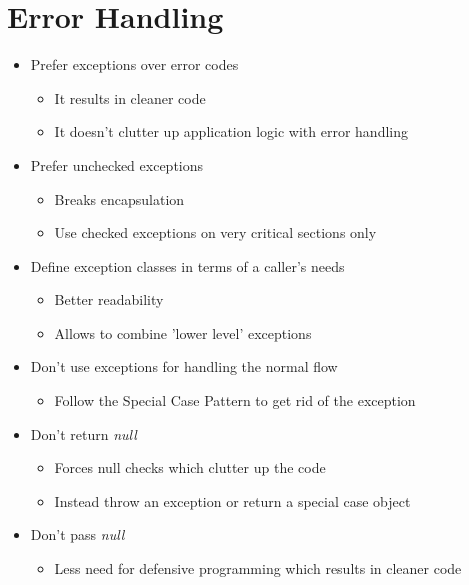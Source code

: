 
\section{Error Handling}
\begin{itemize}
    \item Prefer exceptions over error codes
    \begin{itemize}
        \item It results in cleaner code
        \item It doesn't clutter up application logic with error handling
    \end{itemize}
    \item Prefer unchecked exceptions
    \begin{itemize}
        \item Breaks encapsulation
        \item Use checked exceptions on very critical sections only
    \end{itemize}
    \item Define exception classes in terms of a caller's needs
    \begin{itemize}
        \item Better readability
        \item Allows to combine 'lower level' exceptions
    \end{itemize}
    \item Don't use exceptions for handling the normal flow
    \begin{itemize}
        \item Follow the Special Case Pattern to get rid of the exception
    \end{itemize}
    \item Don't return \textit{null}
    \begin{itemize}
        \item Forces null checks which clutter up the code
        \item Instead throw an exception or return a special case object
    \end{itemize}
    \item Don't pass \textit{null}
    \begin{itemize}
        \item Less need for defensive programming which results in cleaner code
    \end{itemize}
\end{itemize}